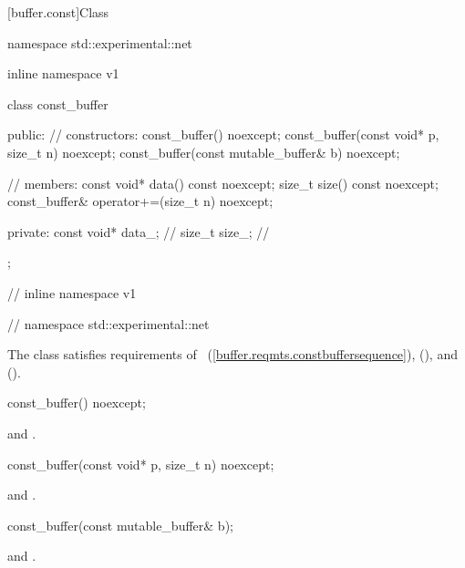 [buffer.const]{Class }

\begin{codeblock}
namespace std::experimental::net {
inline namespace v1 {

  class const_buffer
  {
  public:
    // constructors:
    const_buffer() noexcept;
    const_buffer(const void* p, size_t n) noexcept;
    const_buffer(const mutable_buffer& b) noexcept;

    // members:
    const void* data() const noexcept;
    size_t size() const noexcept;
    const_buffer& operator+=(size_t n) noexcept;

  private:
    const void* data_; // \expos
    size_t size_; // \expos
  };

} // inline namespace v1
} // namespace std::experimental::net
\end{codeblock}

\pnum
The  class satisfies requirements of ~(\ref{buffer.reqmts.constbuffersequence}),  (), and  ().

%
\begin{itemdecl}
const_buffer() noexcept;
\end{itemdecl}

\begin{itemdescr}
\pnum
\postconditions {} and .
\end{itemdescr}

%
\begin{itemdecl}
const_buffer(const void* p, size_t n) noexcept;
\end{itemdecl}

\begin{itemdescr}
\pnum
\postconditions {} and .
\end{itemdescr}

%
\begin{itemdecl}
const_buffer(const mutable_buffer& b);
\end{itemdecl}

\begin{itemdescr}
\pnum
\postconditions {} and .
\end{itemdescr}

